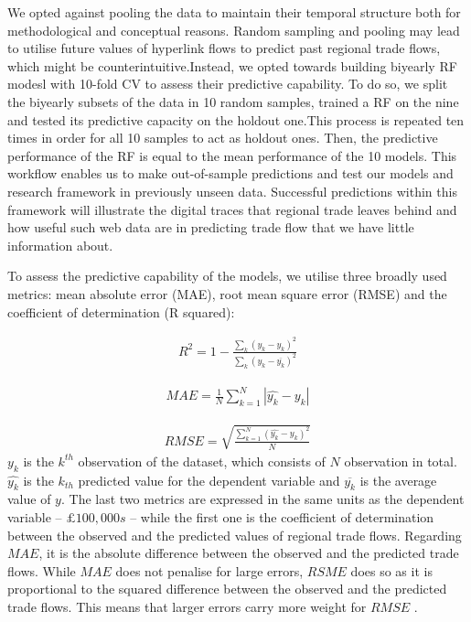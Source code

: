\documentclass[sigconf]{acmart}
\begin{document}
We opted against pooling the data to maintain their temporal structure
both for methodological and conceptual reasons. Random sampling and
pooling may lead to utilise future values of hyperlink flows to predict
past regional trade flows, which might be counterintuitive.Instead, we
opted towards building biyearly RF modesl with 10-fold CV to assess
their predictive capability. To do so, we split the biyearly subsets of
the data in 10 random samples, trained a RF on the nine and tested its
predictive capacity on the holdout one.This process is repeated ten
times in order for all 10 samples to act as holdout ones. Then, the
predictive performance of the RF is equal to the mean performance of the
10 models. This workflow enables us to make out-of-sample predictions
and test our models and research framework in previously unseen data.
Successful predictions within this framework will illustrate the digital
traces that regional trade leaves behind and how useful such web data
are in predicting trade flow that we have little information about.

To assess the predictive capability of the models, we utilise three
broadly used metrics: mean absolute error (MAE), root mean square error
(RMSE) and the coefficient of determination (R squared):

\begin{align}
	R^2 = 1 - \frac{\sum_{k} (y_{k} - \hat{y_{k}})^2} {\sum_{k} (y_{k} - \overline{y_{k}})^2} \label{eq:rsquared}
\end{align}

\begin{align}
	MAE = \frac{1}{N} \sum_{k = 1}^{N} |\hat{y_{k}} - y_{k}| \label{eq:mae}
\end{align}

\begin{align}
	RMSE =  \sqrt{\frac{\sum_{k = 1}^{N} (\hat{y_{k}} - y_{k})^2} {N}} \label{eq:rmse}
\end{align} \(y_{k}\) is the \(k^{th}\) observation of the dataset,
which consists of \(N\) observation in total. \(\hat{y_{k}}\) is the
\(k_{th}\) predicted value for the dependent variable and
\(\overline{y_{k}}\) is the average value of \(y\). The last two metrics
are expressed in the same units as the dependent variable --
\(\pounds 100,000s\) -- while the first one is the coefficient of
determination between the observed and the predicted values of regional
trade flows. Regarding \(MAE\), it is the absolute difference between
the observed and the predicted trade flows. While \(MAE\) does not
penalise for large errors, \(RSME\) does so as it is proportional to the
squared difference between the observed and the predicted trade flows.
This means that larger errors carry more weight for \(RMSE\)
\citep{pontius2008components}.
\end{document}
